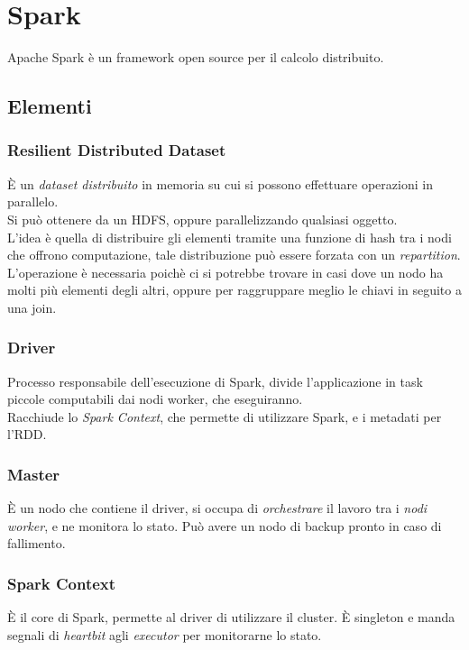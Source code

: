 \section{Spark}
Apache Spark è un framework open source per il calcolo distribuito.

\subsection{Elementi}
\subsubsection{Resilient Distributed Dataset}
È un \emph{dataset distribuito} in memoria su cui si possono effettuare operazioni in parallelo.\\
Si può ottenere da un HDFS, oppure parallelizzando qualsiasi oggetto.\\
L'idea è quella di distribuire gli elementi tramite una funzione di hash tra i nodi 
che offrono computazione, tale distribuzione può essere forzata con un \emph{repartition}.\\
L'operazione è necessaria poichè ci si potrebbe trovare in casi dove un nodo ha molti più 
elementi degli altri, oppure per raggruppare meglio le chiavi in seguito a una join.

\subsubsection{Driver}
Processo responsabile dell'esecuzione di Spark, divide l'applicazione in task piccole
computabili dai nodi worker, che eseguiranno.\\
Racchiude lo \emph{Spark Context}, che permette di utilizzare Spark, e i metadati per l'RDD.

\subsubsection{Master}
È un nodo che contiene il driver, si occupa di \emph{orchestrare} il lavoro tra i \emph{nodi worker}, 
e ne monitora lo stato. Può avere un nodo di backup pronto in caso di fallimento.

\subsubsection{Spark Context}
È il core di Spark, permette al driver di utilizzare il cluster. È singleton e manda segnali 
di \emph{heartbit} agli \emph{executor} per monitorarne lo stato.

